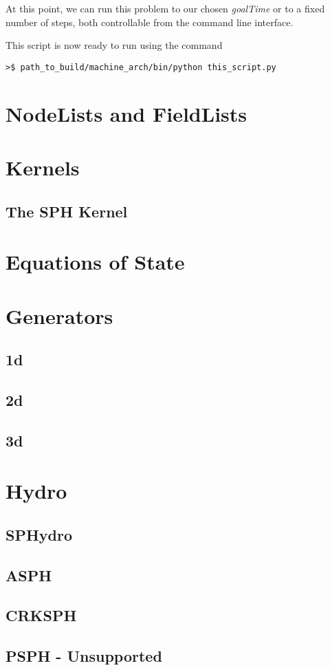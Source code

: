 \documentclass[11pt]{memoir}
\begin{document}


At this point, we can run this problem to our chosen \textit{goalTime} or to a fixed number of steps, both controllable from the command line interface.



This script is now ready to run using the command

\lstset{basicstyle=\small,style=myCustomShellStyle}

\begin{lstlisting}
>$ path_to_build/machine_arch/bin/python this_script.py
\end{lstlisting} 

\chapter{NodeLists and FieldLists}

\chapter{Kernels}
\section{The SPH Kernel}

\chapter{Equations of State}

\chapter{Generators}

\section{1d}
\section{2d}
\section{3d}

\chapter{Hydro}

\section{SPHydro}
\section{ASPH}
\section{CRKSPH}
\section{PSPH - Unsupported}
\end{document}
